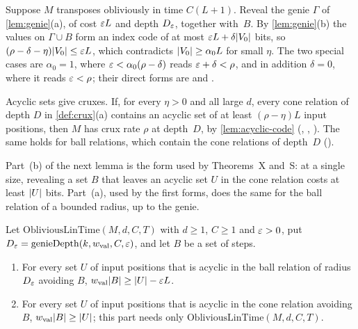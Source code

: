 \begin{outline}
Suppose $M$ transposes obliviously in time $C(L+1)$. Reveal the genie $\Gamma$ of \cref{lem:genie}(a), of cost $\varepsilon L$ and depth
$D_\varepsilon$, together with~$B$. By \cref{lem:genie}(b) the values on $\Gamma\cup B$ form an index code of at most $\varepsilon L+\delta\lvert V_0 \rvert$
bits, so $(\rho-\delta-\eta)\lvert V_0 \rvert\le\varepsilon L$, which contradicts $\lvert V_0 \rvert\ge\alpha_0L$ for small $\eta$. The two special cases
are $\alpha_0=1$, where $\varepsilon<\alpha_0(\rho-\delta)$ reads $\varepsilon+\delta<\rho$, and in addition $\delta=0$, where it reads $\varepsilon<\rho$;
their direct forms are  and .
\end{outline}

Acyclic sets give cruxes. If, for every $\eta>0$ and all large $d$, every cone relation of depth $D$ in \cref{def:crux}(a) contains
an acyclic set of at least $(\rho-\eta)L$ input positions, then $M$ has crux rate $\rho$ at depth~$D$, by \cref{lem:acyclic-code}
(, , ). The same holds for ball relations, which contain the
cone relations of depth~$D$ ().

Part~(b) of the next lemma is the form used by Theorems~X and~S: at a single size, revealing a set $B$ that leaves an acyclic set $U$ in
the cone relation costs at least $\lvert U \rvert$ bits. Part~(a), used by the first forms, does the same for the ball relation of a bounded
radius, up to the genie.

\begin{lemma}\label{lem:acyclic-cost}
Let $\mathrm{ObliviousLinTime}(M,d,C,T)$ with $d\ge1$, $C\ge1$ and $\varepsilon>0$, put $D_\varepsilon=\mathrm{genieDepth}(k,w_{\mathrm{val}},C,\varepsilon)$, and let
$B$ be a set of steps.
\begin{enumerate}[label=(\alph*)]
\item For every set $U$ of input positions that is acyclic in the ball relation of radius $D_\varepsilon$ avoiding $B$,
$w_{\mathrm{val}}\lvert B \rvert\ge\lvert U \rvert-\varepsilon L$.
\item For every set $U$ of input positions that is acyclic in the cone relation avoiding $B$, $w_{\mathrm{val}}\lvert B \rvert\ge\lvert U \rvert$; this part needs
only $\mathrm{ObliviousLinTime}(M,d,C,T)$.
\end{enumerate}
\end{lemma}

